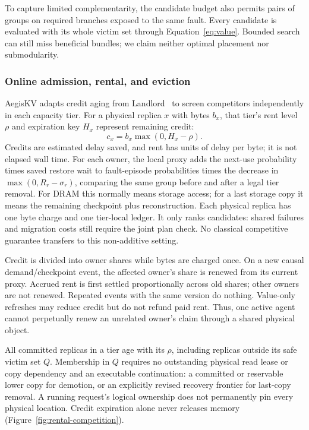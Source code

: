 To capture limited complementarity, the candidate budget also permits
pairs of groups on required branches exposed to the same fault. Every
candidate is evaluated with its whole victim set through
Equation~\ref{eq:value}. Bounded search can still miss beneficial bundles;
we claim neither optimal placement nor submodularity.

\subsubsection{Online admission, rental, and eviction}
\label{sec:placement-plan}

AegisKV adapts credit aging from Landlord~\cite{young2002landlord} to screen
competitors independently in each capacity tier. For a physical replica
$x$ with bytes $b_x$, that tier's rent level $\rho$ and expiration key
$H_x$ represent remaining credit:
\begin{equation}
 c_x=b_x\max(0,H_x-\rho).
 \label{eq:rent}
\end{equation}
Credits are estimated delay saved, and rent has units of delay per byte;
it is not elapsed wall time. For each owner, the local proxy adds the next-use probability times
saved restore wait to fault-episode probabilities times the decrease in
$\max(0,R_r-\sigma_r)$, comparing the same group before and after a legal tier removal.
For DRAM this normally means storage access; for a last storage copy it
means the remaining checkpoint plus reconstruction. Each physical replica
has one byte charge and one tier-local ledger.
It only ranks candidates:
shared failures and migration costs still require the joint plan check.
No classical competitive guarantee transfers to this non-additive setting.

Credit is divided into owner shares while bytes are charged once. On a
new causal demand/checkpoint event, the affected owner's share is renewed
from its current proxy. Accrued rent is first settled proportionally across
old shares; other owners are not renewed. Repeated events with the same
version do nothing. Value-only refreshes may reduce credit but do not
refund paid rent. Thus, one active agent cannot perpetually renew an
unrelated owner's claim through a shared physical object.

All committed replicas in a tier age with its $\rho$, including replicas
outside its safe victim set $Q$. Membership in $Q$ requires no outstanding
physical read lease or copy dependency and an executable continuation:
a committed or reservable lower copy for demotion, or an explicitly
revised recovery frontier for last-copy removal. A running request's
logical ownership does not permanently pin every physical location. Credit
expiration alone never releases memory (Figure~\ref{fig:rental-competition}).

